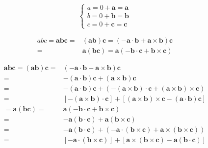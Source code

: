 \documentclass[
]{book}
\theoremstyle{definition}
\theoremstyle{definition}
\theoremstyle{definition}
\theoremstyle{definition}
\theoremstyle{remark}
\begin{document}
\[
\begin{cases}
a=0+\boldsymbol{a}=\boldsymbol{a}\\
b=0+\boldsymbol{b}=\boldsymbol{b}\\
c=0+\boldsymbol{c}=\boldsymbol{c}
\end{cases}
\]

\[
\begin{aligned}
abc=\boldsymbol{a}\boldsymbol{b}\boldsymbol{c}= & \left(\boldsymbol{a}\boldsymbol{b}\right)\boldsymbol{c}=\left(-\boldsymbol{a}\cdot\boldsymbol{b}+\boldsymbol{a}\times\boldsymbol{b}\right)\boldsymbol{c}\\
= & \boldsymbol{a}\left(\boldsymbol{b}\boldsymbol{c}\right)=\boldsymbol{a}\left(-\boldsymbol{b}\cdot\boldsymbol{c}+\boldsymbol{b}\times\boldsymbol{c}\right)
\end{aligned}
\]

\[
\begin{aligned}
\boldsymbol{a}\boldsymbol{b}\boldsymbol{c}=\left(\boldsymbol{a}\boldsymbol{b}\right)\boldsymbol{c}= & \left(-\boldsymbol{a}\cdot\boldsymbol{b}+\boldsymbol{a}\times\boldsymbol{b}\right)\boldsymbol{c}\\
= & -\left(\boldsymbol{a}\cdot\boldsymbol{b}\right)\boldsymbol{c}+\left(\boldsymbol{a}\times\boldsymbol{b}\right)\boldsymbol{c}\\
= & -\left(\boldsymbol{a}\cdot\boldsymbol{b}\right)\boldsymbol{c}+\left(-\left(\boldsymbol{a}\times\boldsymbol{b}\right)\cdot\boldsymbol{c}+\left(\boldsymbol{a}\times\boldsymbol{b}\right)\times\boldsymbol{c}\right)\\
= & \left[-\left(\boldsymbol{a}\times\boldsymbol{b}\right)\cdot\boldsymbol{c}\right]+\left[\left(\boldsymbol{a}\times\boldsymbol{b}\right)\times\boldsymbol{c}-\left(\boldsymbol{a}\cdot\boldsymbol{b}\right)\boldsymbol{c}\right]\\
=\boldsymbol{a}\left(\boldsymbol{b}\boldsymbol{c}\right)= & \boldsymbol{a}\left(-\boldsymbol{b}\cdot\boldsymbol{c}+\boldsymbol{b}\times\boldsymbol{c}\right)\\
= & -\boldsymbol{a}\left(\boldsymbol{b}\cdot\boldsymbol{c}\right)+\boldsymbol{a}\left(\boldsymbol{b}\times\boldsymbol{c}\right)\\
= & -\boldsymbol{a}\left(\boldsymbol{b}\cdot\boldsymbol{c}\right)+\left(-\boldsymbol{a}\cdot\left(\boldsymbol{b}\times\boldsymbol{c}\right)+\boldsymbol{a}\times\left(\boldsymbol{b}\times\boldsymbol{c}\right)\right)\\
= & \left[-\boldsymbol{a}\cdot\left(\boldsymbol{b}\times\boldsymbol{c}\right)\right]+\left[\boldsymbol{a}\times\left(\boldsymbol{b}\times\boldsymbol{c}\right)-\boldsymbol{a}\left(\boldsymbol{b}\cdot\boldsymbol{c}\right)\right]
\end{aligned}
\]
\end{document}
